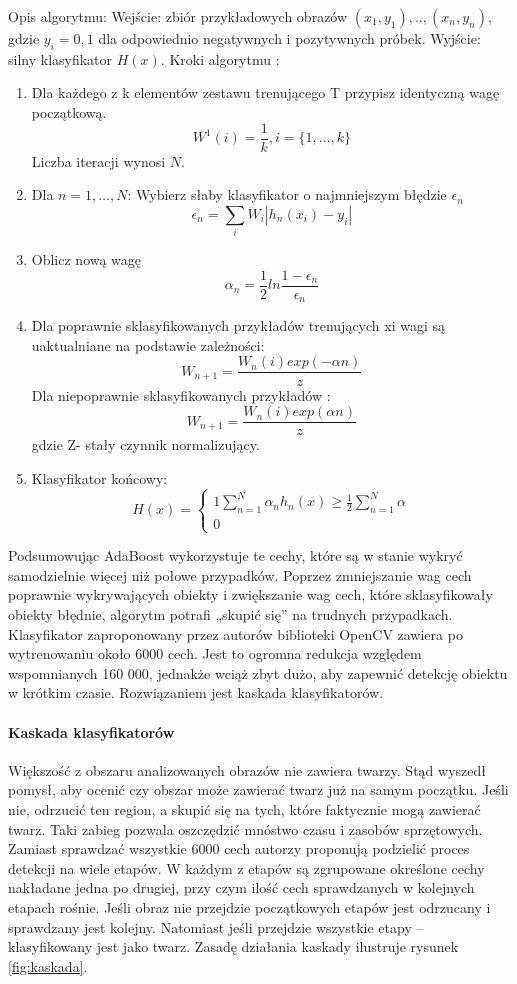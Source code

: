 Opis algorytmu:
Wejście: zbiór przykładowych obrazów $(x_1,y_1),..,(x_n,y_n)$, gdzie $y_i=0,1$ dla odpowiednio negatywnych i pozytywnych próbek.
Wyjście: silny klasyfikator $H(x)$.
Kroki algorytmu :
\begin{enumerate}
\item Dla każdego z k elementów zestawu trenującego T  przypisz identyczną wagę początkową.
$$W^1(i)= \frac{1}{k}  , i = \{1,...,k\} $$
Liczba iteracji wynosi $N$.
\item Dla $n=1,…,N$: 
Wybierz słaby klasyfikator o najmniejszym błędzie $\epsilon_n$
	$$\epsilon_n = \sum_i W_i |h_n(x_i)-y_i	| $$
\item Oblicz nową wagę 
$$\alpha_n = \frac{1}{2} ln \frac{1-\epsilon_n}{\epsilon_n}$$  
\item Dla poprawnie sklasyfikowanych przykładów trenujących xi wagi są uaktualniane na podstawie zależności:
$$W_{n+1} = \frac{W_n(i)exp(-\alpha n)}{z}$$
Dla niepoprawnie sklasyfikowanych przykładów :
$$W_{n+1} = \frac{W_n(i)exp(\alpha n)}{z}$$
gdzie Z- stały czynnik normalizujący.
 
\item Klasyfikator końcowy:
 $$H(x) =\begin{cases}1 \sum^N_{n=1} \alpha_n h_n(x) \geq \frac{1}{2} \sum^N_{n=1} \alpha \\
 0 \end{cases} $$
\end{enumerate} 

Podsumowując AdaBoost wykorzystuje te cechy, które są w stanie wykryć samodzielnie więcej niż połowe przypadków. Poprzez zmniejszanie wag cech poprawnie wykrywających obiekty i zwiększanie wag  cech, które sklasyfikowały obiekty błędnie, algorytm	 potrafi „skupić się” na trudnych przypadkach.	
Klasyfikator zaproponowany przez autorów biblioteki OpenCV zawiera po wytrenowaniu około 6000 cech. Jest to ogromna redukcja względem wspomnianych 160 000,  jednakże wciąż zbyt dużo, aby zapewnić detekcję obiektu w krótkim czasie. Rozwiązaniem jest kaskada klasyfikatorów.
\paragraph{Kaskada klasyfikatorów}

Większość z obszaru analizowanych obrazów nie zawiera twarzy. Stąd wyszedł pomysł,  aby ocenić czy obszar może zawierać twarz już na samym początku. Jeśli nie, odrzucić ten region, a skupić się na tych, które faktycznie mogą zawierać twarz. Taki zabieg pozwala oszczędzić mnóstwo czasu i zasobów sprzętowych.
Zamiast sprawdzać wszystkie 6000 cech autorzy proponują podzielić proces detekcji na wiele etapów. W każdym z etapów są zgrupowane określone cechy nakładane jedna po drugiej, przy czym ilość cech sprawdzanych w kolejnych etapach rośnie. Jeśli obraz nie przejdzie początkowych etapów jest odrzucany i sprawdzany jest kolejny. Natomiast jeśli przejdzie wszystkie etapy – klasyfikowany jest jako twarz. Zasadę działania kaskady ilustruje rysunek \ref{fig:kaskada}.

